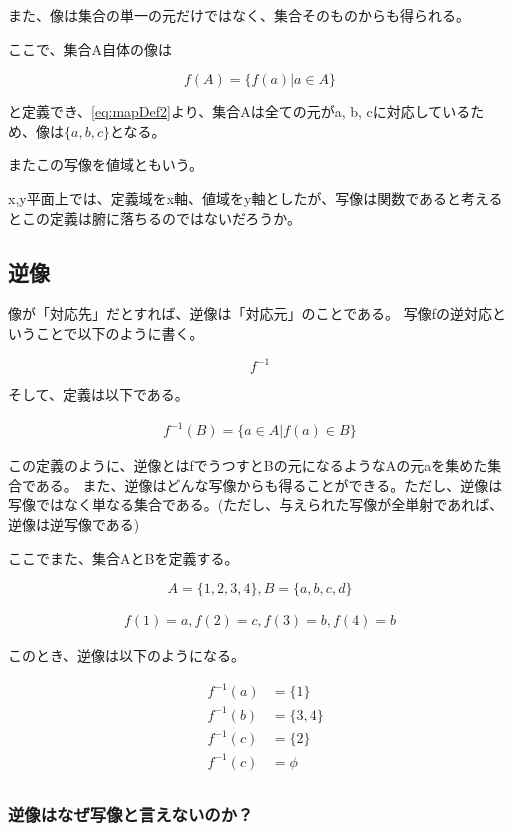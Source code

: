 \documentclass[dvipdfmx,autodetect-engine]{jsarticle}
\begin{document}
また、像は集合の単一の元だけではなく、集合そのものからも得られる。

ここで、集合A自体の像は

$$
f(A) = \{f(a) | a \in A\}
$$

と定義でき、\ref{eq:mapDef2}より、集合Aは全ての元がa, b, cに対応しているため、像は$\{a, b, c\}$となる。

またこの写像を値域ともいう。

x,y平面上では、定義域をx軸、値域をy軸としたが、写像は関数であると考えるとこの定義は腑に落ちるのではないだろうか。

\subsection{逆像}

像が「対応先」だとすれば、逆像は「対応元」のことである。
写像fの逆対応ということで以下のように書く。

$$
f^{-1}
$$

そして、定義は以下である。

\begin{eqnarray}
f^{-1}(B) = \{a \in A | f(a) \in B \}
\label{eq:inverseMapDef}
\end{eqnarray}

この定義のように、逆像とはfでうつすとBの元になるようなAの元aを集めた集合である。
また、逆像はどんな写像からも得ることができる。ただし、逆像は写像ではなく単なる集合である。(ただし、与えられた写像が全単射であれば、逆像は逆写像である)

\exam

ここでまた、集合AとBを定義する。

$$
A = \{ 1, 2, 3, 4 \}, B = \{ a, b, c, d\}
$$

\begin{eqnarray}
f(1) = a, f(2) = c, f(3) = b, f(4) = b
\label{eq:mapDef3}
\end{eqnarray}

このとき、逆像は以下のようになる。

\begin{eqnarray*}
&f^{-1}(a) &= \{1\} \\
&f^{-1}(b) &= \{3, 4\} \\
&f^{-1}(c) &= \{2\} \\
&f^{-1}(c) &= \phi \\
\end{eqnarray*}

\subsubsection{逆像はなぜ写像と言えないのか？}
\end{document}
